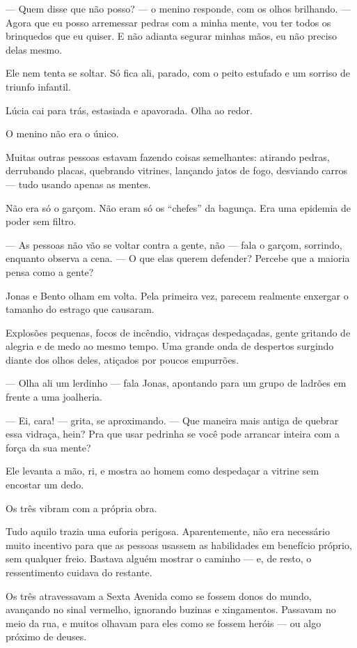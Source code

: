 — Quem disse que não posso? — o menino responde, com os olhos brilhando. — Agora que eu posso arremessar pedras com a minha mente, vou ter todos os brinquedos que eu quiser.  
E não adianta segurar minhas mãos, eu não preciso delas mesmo.

Ele nem tenta se soltar.  
Só fica ali, parado, com o peito estufado e um sorriso de triunfo infantil.

Lúcia cai para trás, estasiada e apavorada.  
Olha ao redor.

O menino não era o único.

Muitas outras pessoas estavam fazendo coisas semelhantes:  
atirando pedras, derrubando placas, quebrando vitrines, lançando jatos de fogo, desviando carros — tudo usando apenas as mentes.

Não era só o garçom.  
Não eram só os “chefes” da bagunça.  
Era uma epidemia de poder sem filtro.

— As pessoas não vão se voltar contra a gente, não — fala o garçom, sorrindo, enquanto observa a cena. — O que elas querem defender?  
Percebe que a maioria pensa como a gente?

Jonas e Bento olham em volta.  
Pela primeira vez, parecem realmente enxergar o tamanho do estrago que causaram.

Explosões pequenas, focos de incêndio, vidraças despedaçadas, gente gritando de alegria e de medo ao mesmo tempo.  
Uma grande onda de despertos surgindo diante dos olhos deles, atiçados por poucos empurrões.

— Olha ali um lerdinho — fala Jonas, apontando para um grupo de ladrões em frente a uma joalheria.

— Ei, cara! — grita, se aproximando. — Que maneira mais antiga de quebrar essa vidraça, hein? Pra que usar pedrinha se você pode arrancar inteira com a força da sua mente?

Ele levanta a mão, ri, e mostra ao homem como despedaçar a vitrine sem encostar um dedo.

Os três vibram com a própria obra.

Tudo aquilo trazia uma euforia perigosa.  
Aparentemente, não era necessário muito incentivo para que as pessoas usassem as habilidades em benefício próprio, sem qualquer freio.
Bastava alguém mostrar o caminho — e, de resto, o ressentimento cuidava do restante.

Os três atravessavam a Sexta Avenida como se fossem donos do mundo, avançando no sinal vermelho, ignorando buzinas e xingamentos.
Passavam no meio da rua, e muitos olhavam para eles como se fossem heróis — ou algo próximo de deuses.

